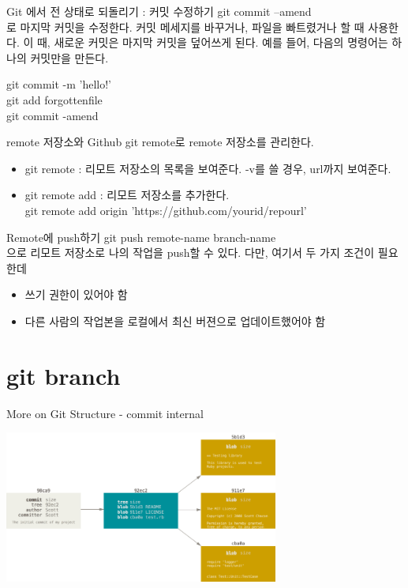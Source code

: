 \documentclass{beamer}
\begin{document}
\begin{frame}{Git 에서 전 상태로 되돌리기 : 커밋 수정하기}
git commit --amend \\
로 마지막 커밋을 수정한다. 커밋 메세지를 바꾸거나, 파일을 빠트렸거나 할 때 사용한다. 이 때, 새로운 커밋은 마지막 커밋을 덮어쓰게 된다. 예를 들어, 다음의 명령어는 하나의 커밋만을 만든다. 

git commit -m 'hello!' \\
git add forgottenfile \\
git commit -amend \\
\end{frame}




\begin{frame}{remote 저장소와 Github}
git remote로 remote 저장소를 관리한다. 

\begin{itemize} 
\item git remote : 리모트 저장소의 목록을 보여준다. -v를 쓸 경우, url까지 보여준다. 
\item git remote add : 리모트 저장소를 추가한다. \\
git remote add origin 'https://github.com/yourid/repourl'
\end{itemize}

\end{frame}

\begin{frame}{Remote에 push하기}
git push remote-name branch-name\\
으로 리모트 저장소로 나의 작업을 push할 수 있다. 다만, 여기서 두 가지 조건이 필요한데 
\begin{itemize} 
\item 쓰기 권한이 있어야 함
\item 다른 사람의 작업본을 로컬에서 최신 버젼으로 업데이트했어야 함
\end{itemize}
\end{frame}

\section{git branch} 

\begin{frame}{More on Git Structure - commit internal} 
\begin{center}
\includegraphics[height=5cm,keepaspectratio]{commit-and-tree}
\end{center}
\end{frame}
\end{document}
